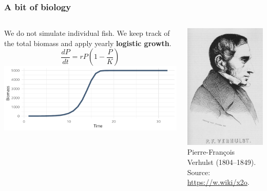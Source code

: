\documentclass[table, 14pt, aspectratio=169]{beamer}
\newcommand{\hl}[1]{\textcolor{OxfordBlue}{\textbf{#1}}}
\begin{document}
\begin{frame}[t]\frametitle{A bit of biology}
  \begin{columns}
    \begin{column}{0.7\textwidth}
      {\small We do not simulate individual fish. We keep track of the total biomass and apply yearly \hl{logistic growth}.}
      $$\frac{dP}{dt}=r P \left(1 - \frac{P}{K}\right)$$
      \includegraphics[width=\linewidth]{images/logistic_growth.pdf}
    \end{column}
    \begin{column}{0.3\textwidth}
      \includegraphics[width=\linewidth]{images/Pierre_Francois_Verhulst.jpg}\\
      \tiny Pierre-François Verhulst (1804--1849).\\Source: \url{https://w.wiki/x2o}.
    \end{column}
  \end{columns}
\end{frame}
\end{document}
